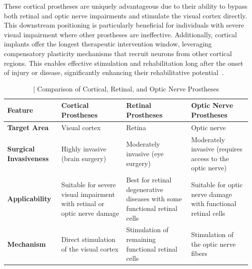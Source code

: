 \documentclass[twocolumn,10pt]{article}
\begin{document}
These cortical prostheses are uniquely advantageous due to their ability to bypass both retinal and optic nerve impairments and stimulate the visual cortex directly. This downstream positioning is particularly beneficial for individuals with severe visual impairment where other prostheses are ineffective. Additionally, cortical implants offer the longest therapeutic intervention window, leveraging compensatory plasticity mechanisms that recruit neurons from other cortical regions. This enables effective stimulation and rehabilitation long after the onset of injury or disease, significantly enhancing their rehabilitative potential~\parencite{tzekovGabelEdArtificial2020, beyelerLearningSeeAgain2017}.

\begin{table}[ht!]
      \centering
      \fontsize{8pt}{10pt}\selectfont
      \caption{| Comparison of Cortical, Retinal, and Optic Nerve Prostheses}\label{tab:prostheses_comparison}
      \begin{tabularx}{\textwidth}{X X X X}
            \hline
            \textbf{Feature}                             & \textbf{Cortical Prostheses}                                                        & \textbf{Retinal Prostheses}                                                    & \textbf{Optic Nerve Prostheses}                                 \\ \hline
            \textbf{Target Area}                         & Visual cortex                                                                       & Retina                                                                         & Optic nerve                                                     \\ \hline
            \textbf{Surgical \newline Invasiveness}      & Highly invasive (brain surgery)                                                     & Moderately invasive (eye surgery)                                              & Moderately invasive (requires access to the optic nerve)        \\ \hline
            \textbf{Applicability}                       & Suitable for severe visual impairment with retinal or optic nerve damage            & Best for retinal degenerative diseases with some functional retinal cells      & Suitable for optic nerve damage with functional retinal cells   \\ \hline
            \textbf{Mechanism}                           & Direct stimulation of the visual cortex                                             & Stimulation of remaining functional retinal cells                              & Stimulation of the optic nerve fibers                           \\ \hline

\end{tabularx}
\end{table}
\end{document}
